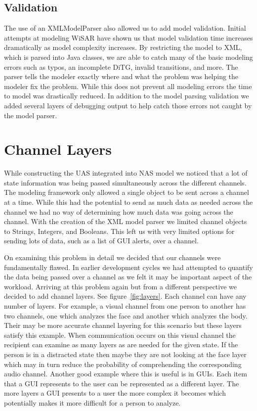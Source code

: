 \subsection{Validation}

The use of an XMLModelParser also allowed us to add model validation.  Initial attempts at modeling WiSAR have shown us that model validation time increases dramatically as model complexity increases.  By restricting the model to XML, which is parsed into Java classes, we are able to catch many of the basic modeling errors such as typos, an incomplete DiTG, invalid transitions, and more.  The parser tells the modeler exactly where and what the problem was helping the modeler fix the problem.  While this does not prevent all modeling errors the time to model was drastically reduced.  In addition to the model parsing validation we added several layers of debugging output to help catch those errors not caught by the model parser.


\section{Channel Layers}

While constructing the UAS integrated into NAS model we noticed that a lot of state information was being passed simultaneously across the different channels.  The modeling framework only allowed a single object to be sent across a channel at a time.  While this had the potential to send as much data as needed across the channel we had no way of determining how much data was going across the channel.  With the creation of the XML model parser we limited channel objects to Strings, Integers, and Booleans.  This left us with very limited options for sending lots of data, such as a list of GUI alerts, over a channel.  

On examining this problem in detail we decided that our channels were fundamentally flawed.  In earlier development cycles we had attempted to quantify the data being passed over a channel as we felt it may be important aspect of the workload.  Arriving at this problem again but from a different perspective we decided to add channel layers. See figure~\ref{fig:layers}.  Each channel can have any number of layers.  For example, a visual channel from one person to another has two channels, one which analyzes the face and another which analyzes the body.  Their may be more accurate channel layering for this scenario but these layers satisfy this example.  When communication occurs on this visual channel the recipient can examine as many layers as are needed for the given state.  If the person is in a distracted state then maybe they are not looking at the face layer which may in turn reduce the probability of comprehending the corresponding audio channel.   Another good example where this is useful is in GUIs.  Each item that a GUI represents to the user can be represented as a different layer.  The more layers a GUI presents to a user the more complex it becomes which potentially makes it more difficult for a person to analyze.

